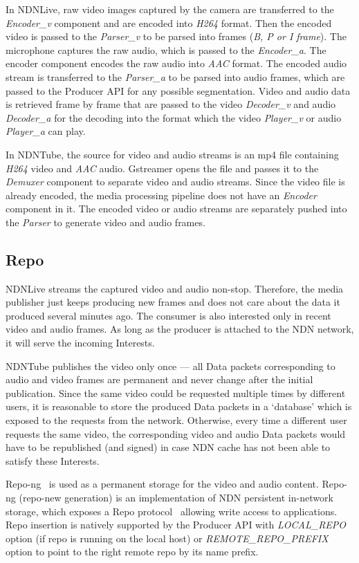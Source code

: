 In NDNLive, raw video images captured by the camera are transferred to the \textit{Encoder\_v} component and are encoded into \textit{H264} format. Then the encoded video is passed to the \textit{Parser\_v} to be parsed into frames (\textit{B, P or I frame}). The microphone captures the raw audio, which is passed to the \textit{Encoder\_a}. The encoder component encodes the raw audio into \textit{AAC} format. The encoded audio stream is transferred to the \textit{Parser\_a} to be parsed into audio frames, which are passed to the Producer API for any possible segmentation. Video and audio data is retrieved frame by frame that are passed to the video \textit{Decoder\_v} and audio \textit{Decoder\_a} for the decoding into the format which the video \textit{Player\_v} or audio \textit{Player\_a} can play.

In NDNTube, the source for video and audio streams is an mp4 file containing \textit{H264} video and \textit{AAC} audio. Gstreamer opens the file and passes it to the \textit{Demuxer} component to separate video and audio streams. Since the video file is already encoded, the media processing pipeline does not have an \textit{Encoder} component in it. The encoded video or audio streams are separately pushed into the \textit{Parser} to generate video and audio frames.


\subsection{Repo}
\label{sec:repo}
NDNLive streams the captured video and audio non-stop. Therefore, the media publisher just keeps producing new frames and does not care about the data it produced several minutes ago. The consumer is also interested only in recent video and audio frames. As long as the producer is attached to the NDN network, it  will serve the incoming Interests. %

NDNTube publishes the video only once --- all Data packets corresponding to audio and video frames are permanent and never change after the initial publication. Since the same video could be requested multiple times by different users, it is reasonable to store the produced Data packets in a `database' which is exposed to the requests from the network. Otherwise, every time a different user requests the same video, the corresponding video and audio Data packets would have to be republished (and signed) in case NDN cache has not been able to satisfy these Interests.

Repo-ng~\cite{repo-ng} is used as a permanent storage for the video and audio content. Repo-ng (repo-new generation) is an implementation of NDN persistent in-network storage, which exposes a Repo protocol~\cite{Repo-Protocol} allowing write access to applications. Repo insertion is natively supported by the Producer API with \textit{LOCAL\_REPO} option (if repo is running on the local host) or \textit{REMOTE\_REPO\_PREFIX} option to point to the right remote repo by its name prefix. 
